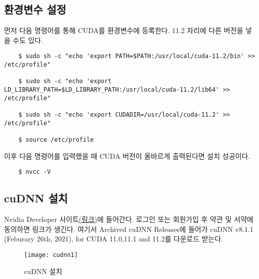 \subsection{환경변수 설정}
먼저 다음 명령어를 통해 CUDA를 환경변수에 등록한다. 11.2 자리에 다른 버전을 넣을 수도 있다.
\begin{lstlisting}
    $ sudo sh -c "echo 'export PATH=$PATH:/usr/local/cuda-11.2/bin' >> /etc/profile"

    $ sudo sh -c "echo 'export LD_LIBRARY_PATH=$LD_LIBRARY_PATH:/usr/local/cuda-11.2/lib64' >> /etc/profile"

    $ sudo sh -c "echo 'export CUDADIR=/usr/local/cuda-11.2' >> /etc/profile"

    $ source /etc/profile
\end{lstlisting}
이후 다음 명령어를 입력했을 때 CUDA 버전이 올바르게 출력된다면 설치 성공이다.
\begin{lstlisting}
    $ nvcc -V
\end{lstlisting}
\subsection{cuDNN 설치}
Nvidia Developer 사이트\href{https://developer.nvidia.com/cudnn}{(링크)}에 들어간다.
로그인 또는 회원가입 후 약관 및 서약에 동의하면 링크가 생긴다. 여기서 Archived cuDNN Releases에 들어가 cuDNN v8.1.1 (Feburary 26th, 2021), for CUDA 11.0,11.1 and 11.2를 다운로드 받는다.
\begin{figure}[H]
	\begin{center}
        \texttt{[image: cudnn1]}
        \caption{cuDNN 설치}
    \end{center}
\end{figure}


